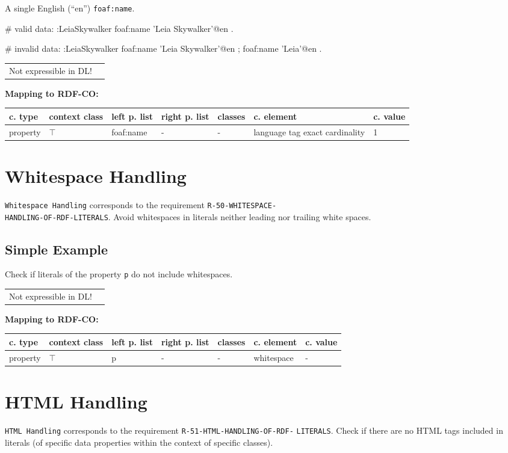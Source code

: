 \documentclass{llncs}
\newcommand{\ms}[1]{\texttt{#1}}
\newenvironment{gcotable}{
  \scriptsize
  \sffamily
  \vspace{0cm}
	\begin{center}
	\textbf{\vspace{0.4cm}Mapping to RDF-CO:} \\
  \begin{tabular}{l|l|l|l|l|l|l}
	\hline
  \textbf{c. type} & \textbf{context class} & \textbf{left p. list} & \textbf{right p. list} & \textbf{classes} & \textbf{c. element} & \textbf{c. value} \\
  \hline

}{
  \hline
  \end{tabular}
	\end{center}
}
\newenvironment{DL}{
  \vspace{0cm}
	\begin{center}
  \begin{tabular}{r l}

}{
  \end{tabular}
	\end{center}
}
\begin{document}
A single English (“en”) \ms{foaf:name}.

\begin{ex}
# valid data:
:LeiaSkywalker
    foaf:name 'Leia Skywalker'@en .
\end{ex}

\begin{ex}
# invalid data:
:LeiaSkywalker
    foaf:name 'Leia Skywalker'@en ;
    foaf:name 'Leia'@en .
\end{ex}

\begin{DL}
Not expressible in DL!
\end{DL}

\begin{gcotable}
property & $\top$ & foaf:name & - & - & language tag exact cardinality & 1 \\
\end{gcotable}

\section{Whitespace Handling}

\ms{Whitespace Handling} corresponds to the requirement
\ms{R-50-WHITESPACE-} \\
\ms{HANDLING-OF-RDF-LITERALS}.
Avoid whitespaces in literals neither leading nor trailing white spaces.

\subsection{Simple Example}

Check if literals of the property \ms{p} do not include whitespaces.

\begin{DL}
Not expressible in DL!
\end{DL}

\begin{gcotable}
property & $\top$ & p & - & - & whitespace & - \\
\end{gcotable}

\section{HTML Handling}

\ms{HTML Handling} corresponds to the requirement
\ms{R-51-HTML-HANDLING-OF-RDF-} \ms{LITERALS}.
Check if there are no HTML tags included in literals (of specific data properties within the context of specific classes).
\end{document}
